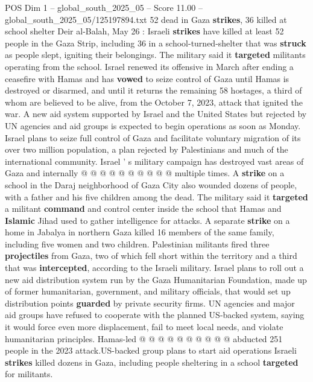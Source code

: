 \begin{textsample}{POS Dim 1 – global\_south\_2025\_05 – Score 11.00 – global\_south\_2025\_05/125197894.txt}  \label{ex:f1_pos_290}
52 dead in Gaza \textbf{strikes}, 36 killed at school shelter Deir al-Balah, May 26 : Israeli \textbf{strikes} have killed at least 52 people in the Gaza Strip, including 36 in a school-turned-shelter that was \textbf{struck} as people slept, igniting their belongings.
The military said it \textbf{targeted} militants operating from the school.
Israel renewed its offensive in March after ending a ceasefire with Hamas and has \textbf{vowed} to seize control of Gaza until Hamas is destroyed or disarmed, and until it returns the remaining 58 hostages, a third of whom are believed to be alive, from the October 7, 2023, attack that ignited the war.
A new aid system supported by Israel and the United States but rejected by UN agencies and aid groups is expected to begin operations as soon as Monday.
Israel plans to seize full control of Gaza and facilitate voluntary migration of its over two million population, a plan rejected by Palestinians and much of the international community.
Israel ' s military campaign has destroyed vast areas of Gaza and internally @ @ @ @ @ @ @ @ @ @ multiple times.
A \textbf{strike} on a school in the Daraj neighborhood of Gaza City also wounded dozens of people, with a father and his five children among the dead.
The military said it \textbf{targeted} a militant \textbf{command} and control center inside the school that Hamas and \textbf{Islamic} Jihad used to gather intelligence for attacks.
A separate \textbf{strike} on a home in Jabalya in northern Gaza killed 16 members of the same family, including five women and two children.
Palestinian militants fired three \textbf{projectiles} from Gaza, two of which fell short within the territory and a third that was \textbf{intercepted}, according to the Israeli military.
Israel plans to roll out a new aid distribution system run by the Gaza Humanitarian Foundation, made up of former humanitarian, government, and military officials, that would set up distribution points \textbf{guarded} by private security firms.
UN agencies and major aid groups have refused to cooperate with the planned US-backed system, saying it would force even more displacement, fail to meet local needs, and violate humanitarian principles.
Hamas-led @ @ @ @ @ @ @ @ @ @ abducted 251 people in the 2023 attack.US-backed group plans to start aid operations Israeli \textbf{strikes} killed dozens in Gaza, including people sheltering in a school \textbf{targeted} for militants.

\end{textsample}
